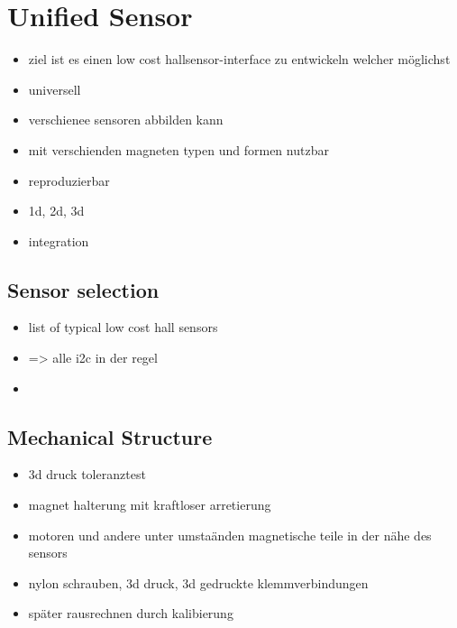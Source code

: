 \hypertarget{unified-sensor}{%
\chapter{Unified Sensor}\label{unified-sensor}}

\begin{itemize}
\tightlist
\item
  ziel ist es einen low cost hallsensor-interface zu entwickeln welcher
  möglichst
\item
  universell
\item
  verschienee sensoren abbilden kann
\item
  mit verschienden magneten typen und formen nutzbar
\item
  reproduzierbar
\item
  1d, 2d, 3d
\item
  integration
\end{itemize}

\hypertarget{sensor-selection}{%
\section{Sensor selection}\label{sensor-selection}}

\begin{itemize}
\tightlist
\item
  list of typical low cost hall sensors
\item
  =\textgreater{} alle i2c in der regel
\item
\end{itemize}

\hypertarget{mechanical-structure}{%
\section{Mechanical Structure}\label{mechanical-structure}}

\begin{itemize}
\tightlist
\item
  3d druck toleranztest
\item
  magnet halterung mit kraftloser arretierung
\item
  motoren und andere unter umstaänden magnetische teile in der nähe des
  sensors
\item
  nylon schrauben, 3d druck, 3d gedruckte klemmverbindungen
\item
  später rausrechnen durch kalibierung
\end{itemize}

